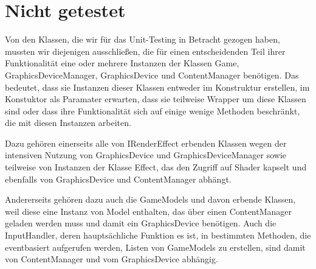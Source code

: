%



\section{Nicht getestet}
\label{Abschnitt:Tests:Protokoll:Nicht_durchgefuehrt}

Von den Klassen, die wir für das Unit-Testing in Betracht gezogen haben, mussten wir diejenigen ausschließen, die für einen entscheidenden Teil ihrer Funktionalität eine oder mehrere Instanzen der Klassen Game, GraphicsDeviceManager, GraphicsDevice und ContentManager benötigen. Das bedeutet, dass sie Instanzen dieser Klassen entweder im Konstruktur erstellen, im Konstuktor als Paramater erwarten, dass sie teilweise Wrapper um diese Klassen sind oder dass ihre Funktionalität sich auf einige wenige Methoden beschränkt, die mit diesen Instanzen arbeiten.

Dazu gehören einerseits alle von IRenderEffect erbenden Klassen wegen der intensiven Nutzung von GraphicsDevice und GraphicsDeviceManager sowie teilweise von Instanzen der Klasse Effect, das den Zugriff auf Shader kapselt und ebenfalls von GraphicsDevice und ContentManager abhängt.

Andererseits gehören dazu auch die GameModels und davon erbende Klassen, weil diese eine Instanz von Model enthalten, das über einen ContentManager geladen werden muss und damit ein GraphicsDevice benötigen. Auch die InputHandler, deren hauptsächliche Funktion es ist, in bestimmten Methoden, die eventbasiert aufgerufen werden, Listen von GameModels zu erstellen, sind damit von ContentManager und vom GraphicsDevice abhängig.







